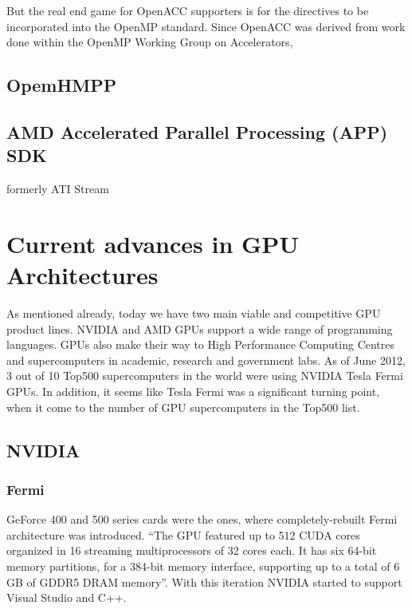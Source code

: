 But the real end game for OpenACC supporters is for the directives to be incorporated into the OpenMP standard.  Since OpenACC was derived from work done within the OpenMP Working Group on Accelerators,

\subsection{OpemHMPP}

\subsection{AMD Accelerated Parallel Processing (APP) SDK}
formerly ATI Stream





\section{Current advances in GPU Architectures}
As mentioned already, today we have two main viable and competitive GPU product lines. NVIDIA and AMD GPUs support a wide range of programming languages. GPUs also make their way to High Performance Computing Centres and supercomputers in academic, research and government labs. As of June 2012, 3 out of 10 Top500 supercomputers in the world were using NVIDIA Tesla Fermi GPUs. In addition, it seems like Tesla Fermi was a significant turning point, when it come to the number of GPU supercomputers in the Top500 list.


\subsection{NVIDIA}
\subsubsection{Fermi}
GeForce 400 and 500 series cards were the ones, where completely-rebuilt Fermi architecture was introduced. \enquote{The GPU featured up to 512 CUDA cores organized in 16 streaming multiprocessors of 32 cores each. It has six 64-bit memory partitions, for a 384-bit memory interface, supporting up to a total of 6 GB of GDDR5 DRAM
memory}. With this iteration NVIDIA started to support Visual Studio and C++.

